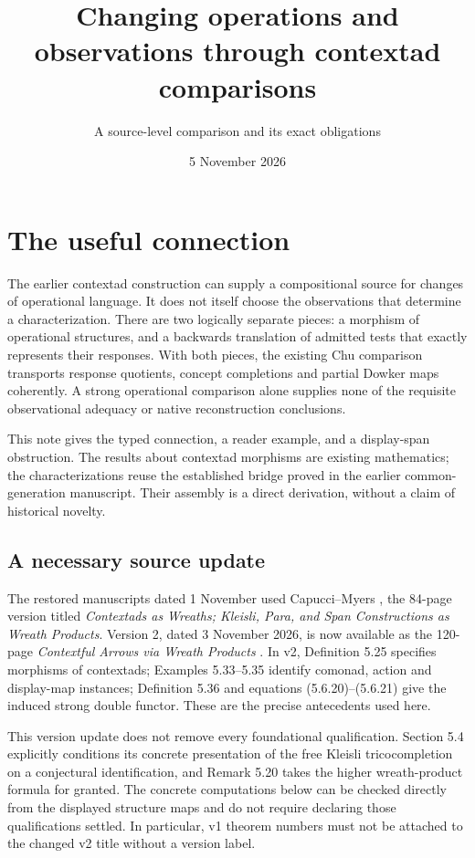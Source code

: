 \documentclass[11pt]{article}
\title{Changing operations and observations through contextad comparisons}
\author{A source-level comparison and its exact obligations}
\date{5 November 2026}
\theoremstyle{definition}\newtheorem{definition}[theorem]{Definition}
\theoremstyle{remark}\newtheorem{remark}[theorem]{Remark}
\begin{document}
\maketitle

\section{The useful connection}
The earlier contextad construction can supply a compositional source for
changes of operational language. It does not itself choose the observations
that determine a characterization. There are two logically separate pieces:
a morphism of operational structures, and a backwards translation of admitted
tests that exactly represents their responses. With both pieces, the existing
Chu comparison transports response quotients, concept completions and partial
Dowker maps coherently. A strong operational comparison alone supplies none of
the requisite observational adequacy or native reconstruction conclusions.

This note gives the typed connection, a reader example, and a display-span
obstruction. The results about contextad morphisms are existing mathematics;
the characterizations reuse the established bridge proved in the earlier
common-generation manuscript. Their assembly is a direct derivation, without a
claim of historical novelty.

\subsection{A necessary source update}
The restored manuscripts dated 1 November used Capucci--Myers
\cite{CM1}, the 84-page version titled \emph{Contextads as Wreaths; Kleisli,
Para, and Span Constructions as Wreath Products}. Version 2, dated 3 November
2026, is now available as the 120-page \emph{Contextful Arrows via Wreath
Products} \cite{CM2}. In v2, Definition 5.25 specifies morphisms of contextads;
Examples 5.33--5.35 identify comonad, action and display-map instances;
Definition 5.36 and equations (5.6.20)--(5.6.21) give the induced strong double
functor. These are the precise antecedents used here.

This version update does not remove every foundational qualification.
Section 5.4 explicitly conditions its concrete presentation of the free
Kleisli tricocompletion on a conjectural identification, and Remark 5.20 takes
the higher wreath-product formula for granted. The concrete computations
below can be checked directly from the displayed structure maps and do not
require declaring those qualifications settled. In particular, v1 theorem
numbers must not be attached to the changed v2 title without a version label.
\end{document}
